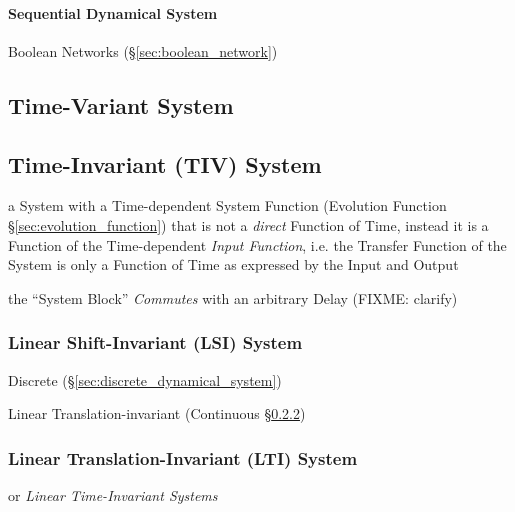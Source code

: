 \paragraph{Sequential Dynamical System}
\label{sec:sequential_dynamical_system}\hfill

\fist Boolean Networks (\S\ref{sec:boolean_network})



\subsection{Time-Variant System}\label{sec:time_variant_system}

\subsection{Time-Invariant (TIV) System}\label{sec:tiv_system}

a System with a Time-dependent System Function (Evolution Function
\S\ref{sec:evolution_function}) that is not a \emph{direct} Function of Time,
instead it is a Function of the Time-dependent \emph{Input Function}, i.e. the
Transfer Function of the System is only a Function of Time as expressed by the
Input and Output

the ``System Block'' \emph{Commutes} with an arbitrary Delay (FIXME: clarify)



\subsubsection{Linear Shift-Invariant (LSI) System}\label{sec:lsi_system}

Discrete (\S\ref{sec:discrete_dynamical_system})

\fist Linear Translation-invariant (Continuous \S\ref{sec:lti_system})



\subsubsection{Linear Translation-Invariant (LTI) System}
\label{sec:lti_system}

or \emph{Linear Time-Invariant Systems}

